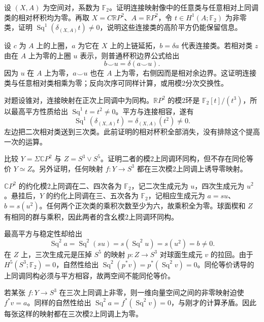\begin{exercise}\label{g2:ex:connecting-classes-relative-products}
	设 \((X,A)\) 为空间对，系数为 \(\mathbb F_2\)。证明连接映射像中的任意类与任意相对上同调类的相对杯积均为零。再取 \(X=C\mathbb RP^2\)、\(A=\mathbb RP^2\)，令 \(t\in H^1(A;\mathbb F_2)\) 为非零类，证明 \(\operatorname{Sq}^1(\delta_{(X,A)}t)\ne0\)，说明这些连接类的高阶平方仍能保留信息。
\end{exercise}
\begin{solution}
	设 \(c\) 为 \(A\) 上的上圈，\(a\) 为它在 \(X\) 上的上链延拓，\(b=\delta a\) 代表连接类。若相对类 \(z\) 由在 \(A\) 上为零的上圈 \(u\) 表示，则普通杯积边界公式给出
	\[
		b\smile u=\delta(a\smile u).
	\]
	因为 \(u\) 在 \(A\) 上为零，\(a\smile u\) 也在 \(A\) 上为零，右侧因而是相对余边界。这证明连接类与任意相对类相乘为零；反向次序可同样计算，或用模2分次交换性。

	对题设锥对，连接映射在正次上同调中为同构。\(\mathbb RP^2\) 的模2环是 \(\mathbb F_2[t]/(t^3)\)，所以最高平方性质给出 \(\operatorname{Sq}^1t=t^2\ne0\)。平方与连接相容，遂有
	\[
		\operatorname{Sq}^1(\delta_{(X,A)}t)=\delta_{(X,A)}(t^2)\ne0.
	\]
	左边把二次相对类送到三次类。此前证明的相对杯积全部消失，没有排除这个提高一次的运算。
\end{solution}

\begin{exercise}\label{g2:ex:suspended-projective-plane-squares}
	比较 \(Y=\Sigma\mathbb CP^2\) 与 \(Z=S^3\vee S^5\)。证明二者的模2上同调环同构，但不存在同伦等价 \(Y\simeq Z\)。另外证明，任何映射 \(f:Y\to S^3\) 都在三次模2上同调上诱导零映射。
\end{exercise}
\begin{solution}
	\(\mathbb CP^2\) 的约化模2上同调在二、四次各为 \(\mathbb F_2\)，记二次生成元为 \(u\)，四次生成元为 \(u^2\)。悬挂后，\(Y\) 的约化上同调在三、五次各为 \(\mathbb F_2\)，记相应生成元为 \(a=su\)、\(b=s(u^2)\)。任何两个正次类的乘积次数至少为六，故乘积全为零。球面楔和 \(Z\) 有相同的群与乘积，因此两者的含幺模2上同调环同构。

	最高平方与稳定性却给出
	\[
		\operatorname{Sq}^2a=\operatorname{Sq}^2(su)=s(\operatorname{Sq}^2u)=s(u^2)=b\ne0.
	\]
	在 \(Z\) 上，三次生成元是压掉 \(S^5\) 的映射 \(p:Z\to S^3\) 对球面生成元 \(v\) 的拉回。由于 \(H^5(S^3;\mathbb F_2)=0\)，自然性给出 \(\operatorname{Sq}^2(p^*v)=p^*(\operatorname{Sq}^2v)=0\)。同伦等价诱导的上同调同构必须与平方相容，故两空间不能同伦等价。

	若某张 \(f:Y\to S^3\) 在三次上同调上非零，则一维向量空间之间的非零映射迫使 \(f^*v=a\)。同样的自然性给出 \(\operatorname{Sq}^2a=f^*(\operatorname{Sq}^2v)=0\)，与刚才的计算矛盾。因此每张这样的映射都在三次模2上同调上为零。
\end{solution}


